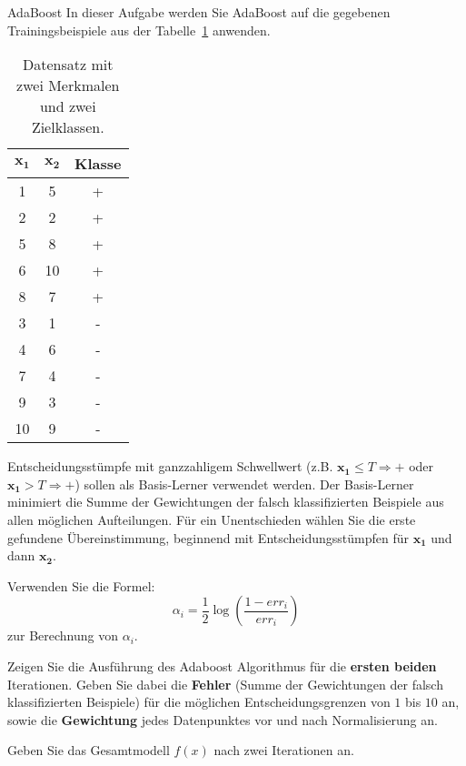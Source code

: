 \begin{task}[credit=15]{AdaBoost}
In dieser Aufgabe werden Sie AdaBoost auf die gegebenen Trainingsbeispiele aus der Tabelle~\ref{t:boost_data} anwenden. 

\begin{table}[h]
\caption{Datensatz mit zwei Merkmalen und zwei Zielklassen.}
\label{t:boost_data}
\centering
\begin{tabular}{c|c|c}
$\mathbf{x_1}$ & $\mathbf{x_2}$  & \textbf{Klasse} \\
\midrule
1 & 5  & +      \\
2 & 2  & +      \\
5 & 8  & +      \\
6 & 10 & +      \\
8 & 7  & +      \\
3  & 1 & -      \\
4  & 6  & -     \\
7  & 4  & -     \\
9  & 3  & -     \\
10 & 9  & -     \\
\bottomrule
\end{tabular}
\end{table}

Entscheidungsstümpfe mit ganzzahligem Schwellwert (z.B. $\mathbf{x_1}\leq T \Rightarrow +$ oder $\mathbf{x_1} > T \Rightarrow +$) sollen als Basis-Lerner verwendet werden. Der Basis-Lerner minimiert die Summe der Gewichtungen der falsch klassifizierten Beispiele aus allen möglichen Aufteilungen. Für ein Unentschieden wählen Sie die erste gefundene Übereinstimmung, beginnend mit Entscheidungsstümpfen für $\mathbf{x_1}$ und dann $\mathbf{x_2}$.

Verwenden Sie die Formel:
\begin{equation}
    \alpha_{i} = \frac{1}{2}\log\left (\frac{1-err_{i}}{err_{i}}\right )
\end{equation}
zur Berechnung von $\alpha_{i}$.

\begin{subtask}[title=Algorithmus,points=12]
 Zeigen Sie die Ausführung des Adaboost Algorithmus für die \textbf{ersten beiden} Iterationen.
 Geben Sie dabei die \textbf{Fehler} (Summe der Gewichtungen der falsch klassifizierten Beispiele) für die möglichen Entscheidungsgrenzen von $1$ bis $10$ an, sowie die \textbf{Gewichtung} jedes Datenpunktes vor und nach Normalisierung an.

\begin{solution}
\end{solution}

\end{subtask}

\begin{subtask}[title=Gesamtmodell,points=3]
 Geben Sie das Gesamtmodell $f(x)$ nach zwei Iterationen an.
 
\begin{solution}
\end{solution}

\end{subtask}

\end{task}

